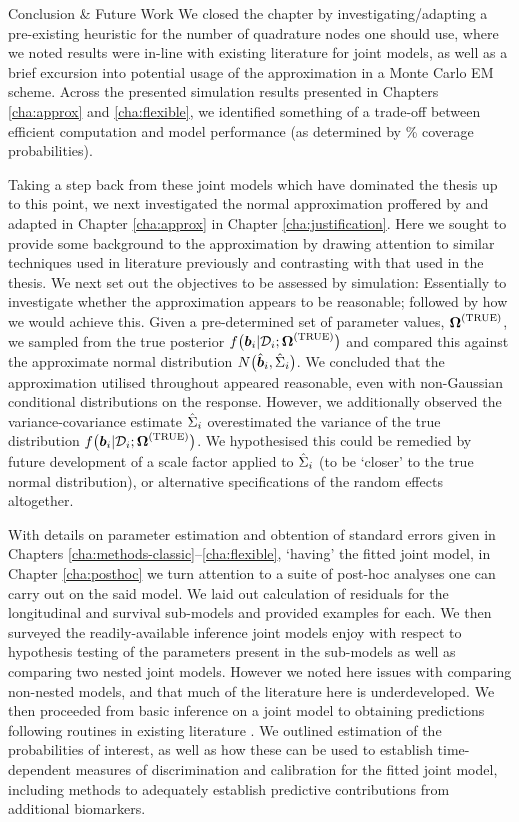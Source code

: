 \begin{chapter}{\label{cha:conclusion}Conclusion \& Future Work}
We closed the chapter by investigating/adapting a pre-existing heuristic for the number of quadrature nodes one should use, where we noted results were in-line with existing literature for joint models, as well as a brief excursion into potential usage of the approximation in a Monte Carlo EM scheme. Across the presented simulation results presented in Chapters \ref{cha:approx} and \ref{cha:flexible}, we identified something of a trade-off between efficient computation and model performance (as determined by \% coverage probabilities).

Taking a step back from these joint models which have dominated the thesis up to this point, we next investigated the normal approximation proffered by \citet{Bernhardt15} and adapted in Chapter \ref{cha:approx} in Chapter \ref{cha:justification}. Here we sought to provide some background to the approximation by drawing attention to similar techniques used in literature previously \citep{Rizopoulos2012} and contrasting with that used in the thesis. We next set out the objectives to be assessed by simulation: Essentially to investigate whether the approximation appears to be reasonable; followed by how we would achieve this. Given a pre-determined set of parameter values, $\bm{\mathrm{\Omega}}^{(\mathrm{TRUE})}$, we sampled from the true posterior $f\big(\bm{b}_i|\mathcal{D}_i;\bm{\mathrm{\Omega}}^{(\mathrm{TRUE})}\big)$ and compared this against the approximate normal distribution $N\big(\hat{\bm{b}}_i,\hat{\Sigma}_i\big)$. We concluded that the approximation utilised throughout appeared reasonable, even with non-Gaussian conditional distributions on the response. However, we additionally observed the variance-covariance estimate $\hat{\Sigma}_i$ overestimated the variance of the true distribution $f\big(\bm{b}_i|\mathcal{D}_i;\bm{\mathrm{\Omega}}^{(\mathrm{TRUE})}\big)$. We hypothesised this could be remedied by future development of a scale factor applied to $\hat{\Sigma}_i$ (\ie to be `closer' to the true normal distribution), or alternative specifications of the random effects altogether.

With details on parameter estimation and obtention of standard errors given in Chapters \ref{cha:methods-classic}--\ref{cha:flexible}, \ie `having' the fitted joint model, in Chapter \ref{cha:posthoc} we turn attention to a suite of post-hoc analyses one can carry out on the said model. We laid out calculation of residuals for the longitudinal and survival sub-models and provided examples for each. We then surveyed the readily-available inference joint models enjoy with respect to hypothesis testing of the parameters present in the sub-models as well as comparing two nested joint models. However we noted here issues with comparing non-nested models, and that much of the literature here is underdeveloped. We then proceeded from basic inference on a joint model to obtaining predictions following routines in existing literature \citep{Rizopoulos2012}. We outlined estimation of the probabilities of interest, as well as how these can be used to establish time-dependent measures of discrimination and calibration for the fitted joint model, including methods to adequately establish predictive contributions from \eg additional biomarkers.


\end{chapter}
